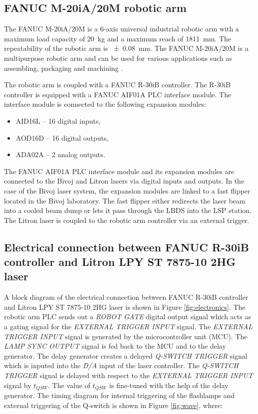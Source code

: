 \subsection{FANUC M-20iA/20M robotic arm}

The FANUC M-20iA/20M is a 6-axis universal industrial robotic arm with a maximum load capacity of \SI{20}{\kg} and a maximum reach of \SI{1811}{\mm}. The repeatability of the robotic arm is \SI{+-0.08}{\mm}. The FANUC M-20iA/20M is a multipurpose robotic arm and can be used for various applications such as assembling, packaging and machining \cite{fanucrobot}.

The robotic arm is coupled with a FANUC R-30iB controller. The R-30iB controller is equipped with a FANUC AIF01A PLC interface module. The interface module is connected to the following expansion modules:

\begin{itemize}
    \item AID16L -- 16 digital inputs,
    \item AOD16D -- 16 digital outputs,
    \item ADA02A -- 2 analog outputs. \cite{fanucunitmanual}
\end{itemize}

The FANUC AIF01A PLC interface module and its expansion modules are connected to the Bivoj and Litron lasers via digital inputs and outputs. In the case of the Bivoj laser system, the expansion modules are linked to a fast flipper located in the Bivoj laboratory. The fast flipper either redirects the laser beam into a cooled beam dump or lets it pass through the LBDS into the LSP station. The Litron laser is coupled to the robotic arm controller via an external trigger. 

\subsection{Electrical connection between FANUC R-30iB controller and Litron LPY ST 7875-10 2HG laser}
 \label{sec:electrical_connection}

A block diagram of the electrical connection between FANUC R-30iB controller and Litron LPY ST 7875-10 2HG laser is shown in Figure \ref{fig:electronics}. The robotic arm PLC sends out a \textit{ROBOT GATE} digital output signal which acts as a gating signal for the \textit{EXTERNAL TRIGGER INPUT} signal. The \textit{EXTERNAL TRIGGER INPUT} signal is generated by the microcontroller unit (MCU). The \textit{LAMP SYNC OUTPUT} signal is fed back to the MCU and to the delay generator. The delay generator creates a delayed \textit{Q-SWITCH TRIGGER} signal which is inputed into the \textit{D/A}  input of the laser controller. The \textit{Q-SWITCH TRIGGER} signal is delayed with respect to the \textit{EXTERNAL TRIGGER INPUT} signal by $t_{QSW}$. The value of $t_{QSW}$ is fine-tuned with the help of the delay generator.  The timing diagram for internal triggering of the flashlamps and external triggering of the Q-switch is shown in Figure \ref{fig:wave}, where:

